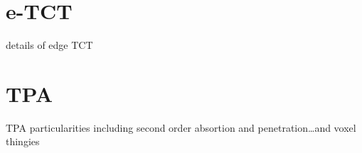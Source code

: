 \section{e-TCT} %
\label{sec:fitting_method}

details of edge TCT


\section{TPA} %
\label{sec:results_and_comparison_with_tracs_rad}

TPA particularities including second order absortion and penetration\ldots and voxel thingies


